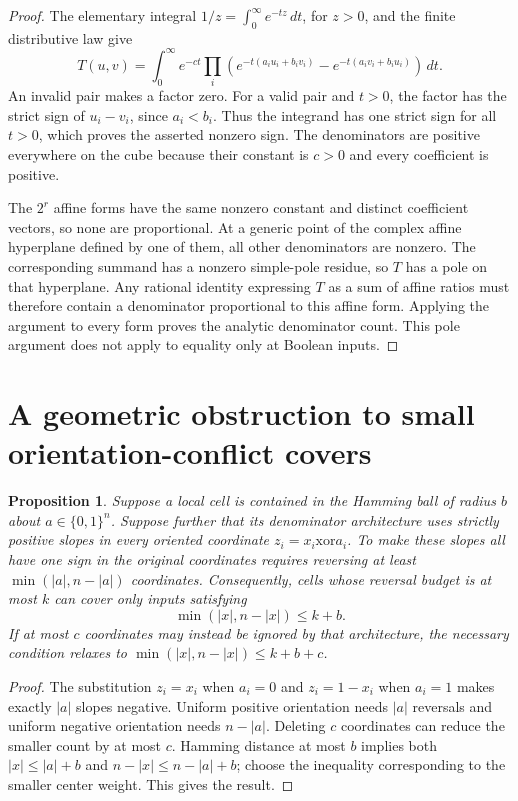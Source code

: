 \documentclass[11pt]{article}
\newtheorem{proposition}[theorem]{Proposition}
\begin{document}
\begin{proof}
The elementary integral $1/z=\int_0^\infty e^{-tz}\,dt$, for $z>0$,
and the finite distributive law give
\[
 T(u,v)=\int_0^\infty e^{-ct}
 \prod_i\left(e^{-t(a_i u_i+b_i v_i)}
             -e^{-t(a_i v_i+b_i u_i)}\right)\,dt.
\]
An invalid pair makes a factor zero. For a valid pair and $t>0$,
the factor has the strict sign of $u_i-v_i$, since $a_i<b_i$.
Thus the integrand has one strict sign for all $t>0$, which proves
the asserted nonzero sign. The denominators are positive everywhere
on the cube because their constant is $c>0$ and every coefficient
is positive.

The $2^r$ affine forms have the same nonzero constant and distinct
coefficient vectors, so none are proportional. At a generic point
of the complex affine hyperplane defined by one of them, all other
denominators are nonzero. The corresponding summand has a nonzero
simple-pole residue, so $T$ has a pole on that hyperplane. Any rational
identity expressing $T$ as a sum of affine ratios must therefore
contain a denominator proportional to this affine form. Applying the
argument to every form proves the analytic denominator count.
This pole argument does not apply to equality only at Boolean inputs.
\end{proof}

\section{A geometric obstruction to small orientation-conflict covers}

\begin{proposition}\label{prop:small-conflict-cover}
Suppose a local cell is contained in the Hamming ball of radius $b$
about $a\in\{0,1\}^n$. Suppose further that its denominator architecture
uses strictly positive slopes in every oriented coordinate
$z_i=x_i\mathbin{\mathrm{xor}}a_i$. To make these slopes all have one
sign in the original coordinates requires reversing at least
$\min(|a|,n-|a|)$ coordinates. Consequently, cells whose reversal
budget is at most $k$ can cover only inputs satisfying
\[
 \min(|x|,n-|x|)\leq k+b.
\]
If at most $c$ coordinates may instead be ignored by that architecture,
the necessary condition relaxes to
$\min(|x|,n-|x|)\leq k+b+c$.
\end{proposition}

\begin{proof}
The substitution $z_i=x_i$ when $a_i=0$ and $z_i=1-x_i$ when $a_i=1$
makes exactly $|a|$ slopes negative. Uniform positive orientation needs
$|a|$ reversals and uniform negative orientation needs $n-|a|$.
Deleting $c$ coordinates can reduce the smaller count by at most $c$.
Hamming distance at most $b$ implies both
$|x|\leq|a|+b$ and $n-|x|\leq n-|a|+b$; choose the inequality
corresponding to the smaller center weight. This gives the result.
\end{proof}
\end{document}
